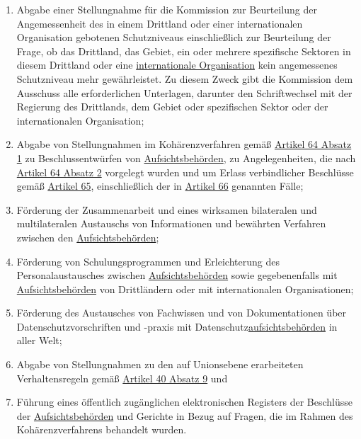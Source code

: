 \begin{enumerate}
\begin{enumerate}
    \item Abgabe einer Stellungnahme für die Kommission zur Beurteilung der Angemessenheit des in einem Drittland oder
     einer internationalen Organisation gebotenen Schutzniveaus einschließlich zur Beurteilung der Frage, ob das
     Drittland, das Gebiet, ein oder mehrere spezifische Sektoren in diesem Drittland oder eine \hyperref[itm:04-26]
     {internationale Organisation} kein angemessenes Schutzniveau mehr gewährleistet. Zu diesem Zweck gibt die
     Kommission dem Ausschuss alle erforderlichen Unterlagen, darunter den Schriftwechsel mit der Regierung des
     Drittlands, dem Gebiet oder spezifischen Sektor oder der internationalen Organisation;%
    \label{itm:70-1s}

    \item Abgabe von Stellungnahmen im Kohärenzverfahren gemäß \hyperref[itm:64-1]{Artikel 64 Absatz 1} zu
     Beschlussentwürfen von \hyperref[itm:04-21]{Aufsichtsbehörden}, zu Angelegenheiten, die nach \hyperref[itm:64-2]
     {Artikel 64 Absatz 2} vorgelegt wurden und um Erlass verbindlicher Beschlüsse gemäß \hyperref[ch:65]{Artikel 65},
     einschließlich der in \hyperref[ch:66]{Artikel 66} genannten Fälle;%
    \label{itm:70-1t}

    \item Förderung der Zusammenarbeit und eines wirksamen bilateralen und multilateralen Austauschs von Informationen
     und bewährten Verfahren zwischen den \hyperref[itm:04-21]{Aufsichtsbehörden};%
    \label{itm:70-1u}

    \item Förderung von Schulungsprogrammen und Erleichterung des Personalaustausches zwischen \hyperref[itm:04-21]
     {Aufsichtsbehörden} sowie gegebenenfalls mit \hyperref[itm:04-21]{Aufsichtsbehörden} von Drittländern oder mit
     internationalen Organisationen;%
    \label{itm:70-1v}

    \item Förderung des Austausches von Fachwissen und von Dokumentationen über Datenschutzvorschriften und -praxis mit
     Datenschutz\hyperref[itm:04-21]{aufsichtsbehörden} in aller Welt;%
    \label{itm:70-1w}

    \item Abgabe von Stellungnahmen zu den auf Unionsebene erarbeiteten Verhaltensregeln gemäß \hyperref[itm:40-9]
     {Artikel 40 Absatz 9} und%
    \label{itm:70-1x}

    \item Führung eines öffentlich zugänglichen elektronischen Registers der Beschlüsse der \hyperref[itm:04-21]
     {Aufsichtsbehörden} und Gerichte in Bezug auf Fragen, die im Rahmen des Kohärenzverfahrens behandelt wurden.%
    \label{itm:70-1y}


\end{enumerate}
\end{enumerate}
